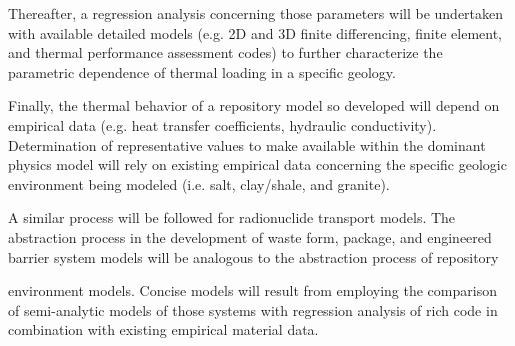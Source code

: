 Thereafter, a regression analysis concerning those parameters will be undertaken 
with available detailed models (e.g. 2D and 3D finite differencing, finite 
element, and thermal performance assessment codes) to further characterize the 
parametric dependence of thermal loading in a specific geology.  


Finally, the thermal behavior of a repository model so developed will depend on 
empirical data (e.g.  heat transfer coefficients, hydraulic conductivity).  
Determination of representative values to make available within the dominant 
physics model will rely on existing empirical data concerning the specific 
geologic environment being modeled (i.e. salt, clay/shale, and granite). 


A similar process will be followed for radionuclide transport models.  The 
abstraction process in the development of waste form, package, and engineered 
barrier system models will be analogous to the abstraction process of repository 

environment models. Concise models will result from employing the comparison of 
semi-analytic models of those systems with regression analysis of rich code in 
combination with existing empirical material data.





